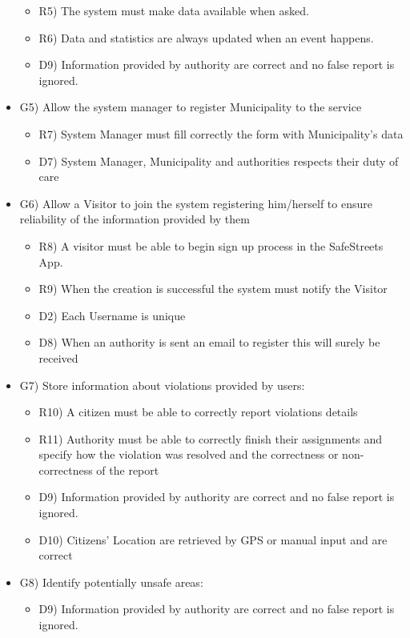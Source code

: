 \begin{itemize}
\begin{itemize}
 \item R5) The system must make data available when asked.
 \item R6) Data and statistics are always updated when an event happens.  
 \item D9) Information provided by authority are correct and no false report is ignored.
\end{itemize}
\item G5) Allow the system manager to register Municipality to the service
\begin{itemize}
\item R7) System Manager must fill correctly the form with Municipality’s data
\item D7) System Manager, Municipality and authorities respects their duty of care
\end{itemize}
\item G6) Allow a Visitor to join the system registering him/herself to ensure reliability of the information provided by them
\begin{itemize}
 \item R8) A visitor must be able to begin sign up process in the SafeStreets App.
 \item R9) When the creation is successful the system must notify the Visitor 
 \item D2) Each Username is unique
 \item D8) When an authority is sent an email to register this will surely be received
\end{itemize}
\item G7) Store information about violations provided by users:
\begin{itemize}
 \item R10) A citizen must be able to correctly report violations details
 \item R11) Authority must be able to correctly finish their assignments and specify how the  violation was resolved and the correctness or non-correctness of the report
 \item D9) Information provided by authority are correct and no false report is ignored.
 \item D10) Citizens’ Location are retrieved by GPS or manual input and are correct
\end{itemize}
\item G8) Identify potentially unsafe areas:
\begin{itemize}
\item D9) Information provided by authority are correct and no false report is ignored.

\end{itemize}
\end{itemize}

